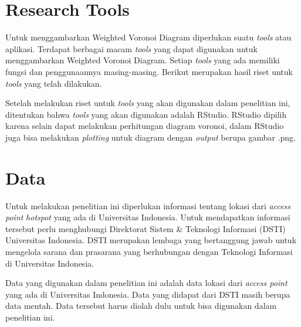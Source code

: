 \section{Research Tools}
Untuk menggambarkan Weighted Voronoi Diagram diperlukan suatu \textit{tools} atau aplikasi. Terdapat berbagai macam \textit{tools} yang dapat digunakan untuk menggambarkan Weighted Voronoi Diagram. Setiap \textit{tools} yang ada memiliki fungsi dan penggunaannya masing-masing. Berikut merupakan hasil riset untuk \textit{tools} yang telah dilakukan.

\begin{table}[H]
\centering
\caption{Hasil Riset \textit{Tools}}
\label{research-tools}
\end{table}

Setelah melakukan riset untuk \textit{tools} yang akan digunakan dalam penelitian ini, ditentukan bahwa \textit{tools} yang akan digunakan adalah RStudio. RStudio dipilih karena selain dapat melakukan perhitungan diagram voronoi, dalam RStudio juga bisa melakukan \textit{plotting} untuk diagram dengan \textit{output} berupa gambar .png.

\section{Data}
Untuk melakukan penelitian ini diperlukan informasi tentang lokasi dari \textit{access point} \textit{hotspot} yang ada di Universitas Indonesia. Untuk mendapatkan informasi tersebut perlu menghubungi Direktorat Sistem & Teknologi Informasi (DSTI) Universitas Indonesia. DSTI merupakan lembaga yang bertanggung jawab untuk mengelola sarana dan prasarana yang berhubungan dengan Teknologi Informasi di Universitas Indonesia. 

Data yang digunakan dalam penelitian ini adalah data lokasi dari \textit{access point} yang ada di Universitas Indonesia. Data yang didapat dari DSTI {\ui} masih berupa data mentah. Data tersebut harus diolah dulu untuk bisa digunakan dalam penelitian ini.

